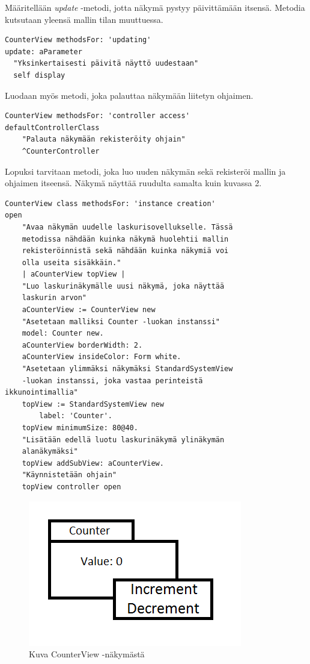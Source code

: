 \documentclass[finnish,utf8,nonumbib,palatino,kandi]{gradu2}
\begin{document}
Määritellään \emph{update} -metodi, jotta näkymä pystyy päivittämään itsensä. Metodia kutsutaan
yleensä mallin tilan muuttuessa.
\begin{lstlisting}[language=Smalltalk]
CounterView methodsFor: 'updating'
update: aParameter
  "Yksinkertaisesti päivitä näyttö uudestaan"
  self display
\end{lstlisting}
Luodaan myös metodi, joka palauttaa näkymään liitetyn ohjaimen.
\begin{lstlisting}[language=Smalltalk]
CounterView methodsFor: 'controller access'
defaultControllerClass
	"Palauta näkymään rekisteröity ohjain"
	^CounterController
\end{lstlisting}

Lopuksi tarvitaan metodi, joka luo uuden näkymän sekä rekisteröi mallin ja ohjaimen itseensä. Näkymä näyttää ruudulta
samalta kuin kuvassa 2.
\begin{lstlisting}[language=Smalltalk]
CounterView class methodsFor: 'instance creation'
open
	"Avaa näkymän uudelle laskurisovellukselle. Tässä 
	metodissa nähdään kuinka näkymä huolehtii mallin 
	rekisteröinnistä sekä nähdään kuinka näkymiä voi 
	olla useita sisäkkäin."
	| aCounterView topView |
	"Luo laskurinäkymälle uusi näkymä, joka näyttää 
	laskurin arvon"
	aCounterView := CounterView new
	"Asetetaan malliksi Counter -luokan instanssi"
	model: Counter new.
	aCounterView borderWidth: 2.
	aCounterView insideColor: Form white.
	"Asetetaan ylimmäksi näkymäksi StandardSystemView 
	-luokan instanssi, joka vastaa perinteistä
ikkunointimallia"
	topView := StandardSystemView new
		label: 'Counter'.
	topView minimumSize: 80@40.
	"Lisätään edellä luotu laskurinäkymä ylinäkymän 
	alanäkymäksi"
	topView addSubView: aCounterView.
	"Käynnistetään ohjain"
	topView controller open
\end{lstlisting}

\begin{figure}[h]
\centering
\includegraphics[scale=0.85]{counter.png}
\caption{Kuva CounterView -näkymästä \cite{Krasner:desc}}
\end{figure}
\end{document}
